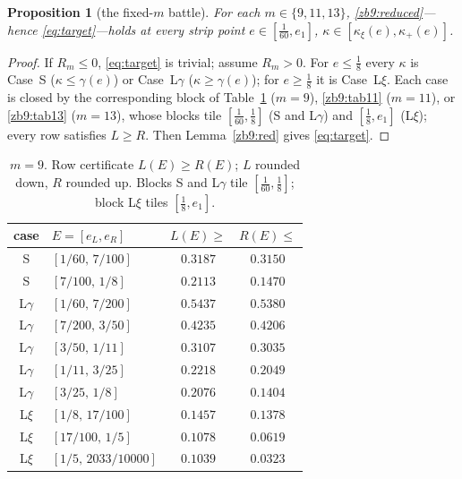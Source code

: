 \documentclass[11pt]{amsart}
\newtheorem{proposition}[theorem]{Proposition}
\newcommand{\kxi}{\kappa_\xi}
\newcommand{\khi}{\kappa_{+}}
\begin{document}
\begin{proposition}[the fixed-$m$ battle]\label{zb9:battle}
For each $m\in\{9,11,13\}$, \eqref{zb9:reduced}---hence \eqref{eq:target}---holds
at every strip point $e\in[\tfrac1{60},e_1]$, $\kappa\in[\kxi(e),\khi(e)]$.
\end{proposition}

\begin{proof}
If $R_m\le0$, \eqref{eq:target} is trivial; assume $R_m>0$.  For $e\le\tfrac18$
every $\kappa$ is Case~S ($\kappa\le\gamma(e)$) or Case~L$\gamma$
($\kappa\ge\gamma(e)$); for $e\ge\tfrac18$ it is Case~L$\xi$.  Each case is
closed by the corresponding block of Table~\ref{zb9:tab9} ($m=9$),
\ref{zb9:tab11} ($m=11$), or \ref{zb9:tab13} ($m=13$), whose blocks tile
$[\tfrac1{60},\tfrac18]$ (S and L$\gamma$) and $[\tfrac18,e_1]$ (L$\xi$); every
row satisfies $L\ge R$.  Then Lemma~\ref{zb9:red} gives \eqref{eq:target}.
\end{proof}

\begin{table}[h]\centering
\caption{$m=9$.  Row certificate $L(E)\ge R(E)$; $L$ rounded down, $R$ rounded
up.  Blocks S and L$\gamma$ tile $[\tfrac1{60},\tfrac18]$; block L$\xi$ tiles
$[\tfrac18,e_1]$.}\label{zb9:tab9}
\begin{tabular}{clcc}\toprule
case & $E=[e_L,e_R]$ & $L(E)\ge$ & $R(E)\le$\\\midrule
S       & $[1/60,\,7/100]$   & $0.3187$ & $0.3150$\\
S       & $[7/100,\,1/8]$    & $0.2113$ & $0.1470$\\\midrule
L$\gamma$ & $[1/60,\,7/200]$ & $0.5437$ & $0.5380$\\
L$\gamma$ & $[7/200,\,3/50]$ & $0.4235$ & $0.4206$\\
L$\gamma$ & $[3/50,\,1/11]$  & $0.3107$ & $0.3035$\\
L$\gamma$ & $[1/11,\,3/25]$  & $0.2218$ & $0.2049$\\
L$\gamma$ & $[3/25,\,1/8]$   & $0.2076$ & $0.1404$\\\midrule
L$\xi$  & $[1/8,\,17/100]$   & $0.1457$ & $0.1378$\\
L$\xi$  & $[17/100,\,1/5]$   & $0.1078$ & $0.0619$\\
L$\xi$  & $[1/5,\,2033/10000]$ & $0.1039$ & $0.0323$\\
\bottomrule\end{tabular}
\end{table}
\end{document}
